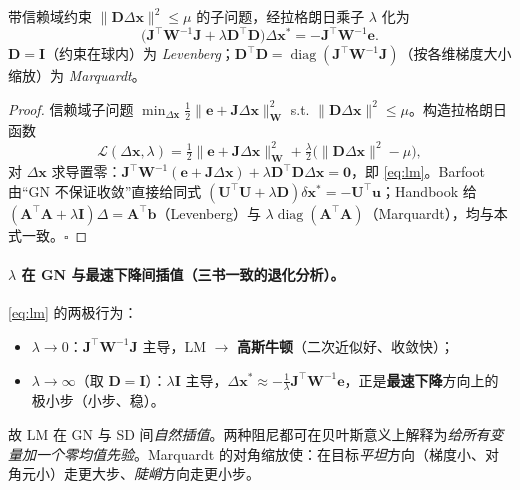 \begin{proposition}[LM 阻尼增量方程]\label{prop:lm}
带信赖域约束 $\|\mathbf{D}\Delta\mathbf{x}\|^2\le\mu$ 的子问题，经拉格朗日乘子 $\lambda$ 化为
\begin{equation}
  \big(\mathbf{J}^\top\mathbf{W}^{-1}\mathbf{J}+\lambda\mathbf{D}^\top\mathbf{D}\big)\Delta\mathbf{x}^*=-\mathbf{J}^\top\mathbf{W}^{-1}\mathbf{e}.
  \label{eq:lm}
\end{equation}
$\mathbf{D}=\mathbf{I}$（约束在球内）为 \emph{Levenberg}；$\mathbf{D}^\top\mathbf{D}=\operatorname{diag}(\mathbf{J}^\top\mathbf{W}^{-1}\mathbf{J})$（按各维梯度大小缩放）为 \emph{Marquardt}\cite{gaoxiang2019slam14,carlone2026handbook}。
\end{proposition}
\begin{proof}
信赖域子问题 $\min_{\Delta\mathbf{x}}\tfrac12\|\mathbf{e}+\mathbf{J}\Delta\mathbf{x}\|_{\mathbf{W}}^2$ s.t. $\|\mathbf{D}\Delta\mathbf{x}\|^2\le\mu$。构造拉格朗日函数
\[
  \mathcal{L}(\Delta\mathbf{x},\lambda)=\tfrac12\|\mathbf{e}+\mathbf{J}\Delta\mathbf{x}\|_{\mathbf{W}}^2+\tfrac{\lambda}{2}\big(\|\mathbf{D}\Delta\mathbf{x}\|^2-\mu\big),
\]
对 $\Delta\mathbf{x}$ 求导置零：$\mathbf{J}^\top\mathbf{W}^{-1}(\mathbf{e}+\mathbf{J}\Delta\mathbf{x})+\lambda\mathbf{D}^\top\mathbf{D}\Delta\mathbf{x}=\mathbf{0}$，即 \cref{eq:lm}。Barfoot\cite{barfoot2024state} 由“GN 不保证收敛”直接给同式 $(\mathbf{U}^\top\mathbf{U}+\lambda\mathbf{D})\delta\mathbf{x}^*=-\mathbf{U}^\top\mathbf{u}$；Handbook\cite{carlone2026handbook} 给 $(\mathbf{A}^\top\mathbf{A}+\lambda\mathbf{I})\Delta=\mathbf{A}^\top\mathbf{b}$（Levenberg）与 $\lambda\operatorname{diag}(\mathbf{A}^\top\mathbf{A})$（Marquardt），均与本式一致。\hfill$\square$
\end{proof}

\paragraph{$\lambda$ 在 GN 与最速下降间插值（三书一致的退化分析）。}\cite{gaoxiang2019slam14,barfoot2024state,carlone2026handbook}
\cref{eq:lm} 的两极行为：
\begin{itemize}
  \item $\lambda\to0$：$\mathbf{J}^\top\mathbf{W}^{-1}\mathbf{J}$ 主导，LM $\to$ \textbf{高斯牛顿}（二次近似好、收敛快）；
  \item $\lambda\to\infty$（取 $\mathbf{D}=\mathbf{I}$）：$\lambda\mathbf{I}$ 主导，$\Delta\mathbf{x}^*\approx-\tfrac1\lambda\mathbf{J}^\top\mathbf{W}^{-1}\mathbf{e}$，正是\textbf{最速下降}方向上的极小步（小步、稳）。
\end{itemize}
故 LM 在 GN 与 SD 间\emph{自然插值}。两种阻尼都可在贝叶斯意义上解释为\emph{给所有变量加一个零均值先验}\cite{carlone2026handbook}。Marquardt 的对角缩放使：在目标\emph{平坦}方向（梯度小、对角元小）走更大步、\emph{陡峭}方向走更小步。

